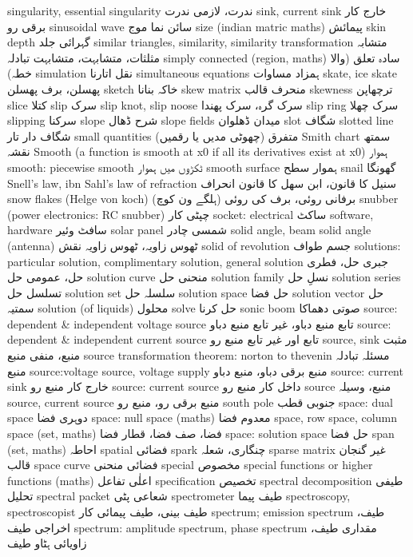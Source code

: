 singularity, essential singularity	ندرت، لازمی ندرت
sink, current sink	خارج کار برقی رو
sinusoidal wave	سائن نما موج
size (indian matric maths)	پیمائش
skin depth	گہرائی جلد
similar triangles, similarity, similarity transformation	متشابہ مثلثات، متشابہت، متشابہت تبادلہ
simply connected (region, maths)	سادہ تعلق (والا خطہ)
simulation	نقل اتارنا
simultaneous equations	ہمزاد مساوات
skate, ice skate	پھسلن، برف پھسلن
sketch	خاکہ بنانا
skew matrix	منحرف قالب
skewness	ترچھاپن
slice	کتلا
slip	سرک
slip knot, slip noose	سرک گرہ، سرک پھندا
slip ring	سرک چھلا
slipping	سرکنا
slope	شرح ڈھال
slope fields	میدان ڈھلوان
slot	شگاف
slotted line	شگاف دار تار
small quantities	متفرق (چھوٹی مدیں یا رقمیں)
Smith chart	سمتھ نقشہ
Smooth (a function is smooth at x0 if all its derivatives exist at x0)	ہموار
smooth: piecewise smooth	ٹکڑوں میں ہموار
smooth surface	ہموار سطح
snail	گھونگا
Snell's law,  ibn Sahl's law of refraction	سنیل کا قانون، ابن سھل کا قانون انحراف
snow flakes (Helge von koch)	برفانی روئی، برف کی روئی (ہلگے ون کوچ)
snubber (power electronics: RC snubber)	چپٹی کار
socket: electrical	ساکٹ
software, hardware	سافٹ وئیر
solar panel	شمسی چادر
solid angle, beam solid angle (antenna)	ٹھوس زاویہ، ٹھوس زاویہ نقش
solid of revolution	جسم طواف
solutions: particular solution, complimentary solution, general solution	جبری حل، فطری حل، عمومی حل
solution curve	منحنی حل
solution family	نسلِ حل
solution series	تسلسل حل
solution set	سلسلہ حل
solution space	حل فضا
solution vector	حل سمتیہ
solution (of liquids)	محلول
solve	حل کرنا
sonic boom	صوتی دھماکا
source: dependent & independent voltage source	تابع منبع دباو، غیر تابع منبع دباو
source: dependent & independent current source	تابع اور غیر تابع منبع رو
source, sink	مثبت منبع، منفی منبع
source transformation theorem: norton to thevenin	مسئلہ تبادلہ منبع
source:voltage source, voltage supply	منبع برقی دباو، منبع دباو
source: current sink	خارج کار منبع رو
source: current source	داخل کار منبع رو
source	منبع، وسیلہ
source, current source	منبع برقی رو، منبع رو
south pole	جنوبی قطب
space: dual space	دوہری فضا
space: null space (maths)	معدوم فضا
space, row space, column space (set, maths)	فضا، صف فضا، قطار فضا
space: solution space	حل فضا
span (set, maths)	احاطہ
spatial	فضائی
spark	چنگاری، شعلہ
sparse matrix	غیر گنجان قالب
space curve	فضائی منحنی
special	مخصوص
special functions or higher functions (maths)	اعلٰی تفاعل
specification	تخصیص
spectral decomposition	طیفی تحلیل
spectral packet	شعاعی پٹی
spectrometer	طیف پیما
spectroscopy, spectroscopist	طیف بینی، طیف پیمائی کار
spectrum; emission spectrum	طیف، اخراجی طیف
spectrum: amplitude spectrum, phase spectrum	مقداری طیف، زاویائی ہٹاو طیف
